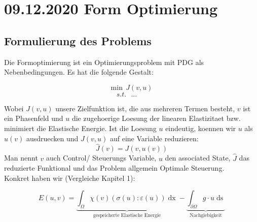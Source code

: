 \documentclass[a4paper, 12pt]{scrartcl}
\begin{document}





\section{09.12.2020 Form Optimierung}
\subsection{Formulierung des Problems}

Die Formoptimierung ist ein Optimierungsproblem mit PDG als Nebenbedingungen.
Es hat die folgende Gestalt:

$$\mathrm{min}\ \  J(v, u)$$
$$s. t. \ \ \  ... \ \ \quad $$

Wobei $J(v, u)$ unsere Zielfunktion ist, die aus mehreren Termen besteht, $v$ ist ein Phasenfeld und $u$ 
die zugehoerige Loesung der linearen Elastizitaet bzw. minimiert die Elastische Energie. 
Ist die Loesung $u$ eindeutig, koennen wir $u$ als $u(v)$
ausdruecken und $J(v, u)$ auf eine Variable reduzieren: \\
$$\hat{J} (v) = J(v, u(v))$$
Man nennt $v$ auch Control/ Steuerungs Variable, $u$ den associated State, $\hat{J}$ das reduzierte Funktional und
das Problem allgemein Optimale Steuerung. \\  
Konkret haben wir (Vergleiche Kapitel 1): 

\[ E(u, v) = \underbrace{\int_\Omega \chi(v) (\sigma(u) : \varepsilon(u)) \mathop{dx}}_{\text{gespeicherte Elastische Energie}} - \underbrace{ \int_{\partial \Omega} g \cdot u \mathop{ds}}_{\text{Nachgiebigkeit}} \]
\end{document}
